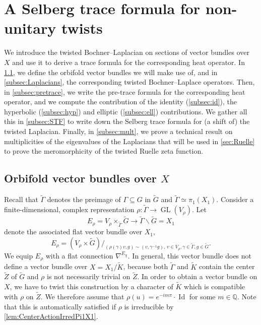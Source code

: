 \documentclass[JEP,XML,SOM,Unicode,NoFloatCountersInSection,published]{cedram}
\theoremstyle{plain}
\theoremstyle{definition}
\theoremstyle{remark}
\newcommand{\Q}{\mathbb{Q}}
\DeclareMathOperator{\GL}{GL}
\DeclareMathOperator{\Id}{Id}
\numberwithin{equation}{section}
\begin{document}
\section{A Selberg trace formula for non-unitary twists}
\label{sec:STF}
We introduce the twisted Bochner--Laplacian on sections of vector bundles over~$X$ and use it to derive a trace formula for the corresponding heat operator. In \cref{subsec:vect},
we define the orbifold vector bundles we will make use of, and in \cref{subsec:Laplacians}, the corresponding twisted Bochner--Laplace operators. Then, in \cref{subsec:pretrace}, we write the pre-trace formula for the corresponding heat operator, and we compute the contribution of the identity (\cref{subsec:id}), the hyperbolic (\cref{subsec:hyp}) and elliptic (\cref{subsec:ell}) contributions. We gather all this in \cref{subsec:STF} to write down the Selberg trace formula for (a shift of) the twisted Laplacian. Finally, in \cref{subsec:mult}, we prove a technical result on multiplicities of the eigenvalues of the Laplacians that will be used in \cref{sec:Ruelle} to prove the meromorphicity of the twisted Ruelle zeta function.

\subsection{Orbifold vector bundles over $X$}
\label{subsec:vect}

Recall that $\widetilde{\Gamma}$ denotes the preimage of $\Gamma\subseteq G$ in $\widetilde{G}$ and $\widetilde{\Gamma}\simeq\pi_1(X_1)$. Consider a finite-dimensional, complex representation $\rho:\widetilde{\Gamma}\to\GL(V_\rho)$. Let
\[
E_\rho = V_\rho\times_{\widetilde{\Gamma}}\widetilde{G}\to\widetilde{\Gamma}\backslash\widetilde{G}=X_1
\]
denote the associated flat vector bundle over $X_1$, \ie
\[
E_\rho = (V_\rho\times\widetilde{G})/_{(\rho(\gamma)v,g)\sim(v,\gamma^{-1}g),\,v\in V_\rho,\gamma\in\widetilde{\Gamma},g\in\widetilde{G}}.
\]
We equip $E_\rho$ with a flat connection $\nabla^{E_\chi}$. In general, this vector bundle does not define a vector bundle over $X=X_1/\widetilde{K}$, because both $\widetilde{\Gamma}$ and $\widetilde{K}$ contain the center $\widetilde{Z}$ of $\widetilde{G}$ and $\rho$ is not necessarily trivial on $\widetilde{Z}$. In order to obtain a vector bundle on $X$, we have to twist this construction by a character of $\widetilde{K}$ which is compatible with $\rho$ on $\widetilde{Z}$. We therefore assume that $\rho(u)=e^{-im\pi} \cdot \Id$ for some $m\in\Q$. Note that this is automatically satisfied if $\rho$ is irreducible by \cref{lem:CenterActionIrredPi1X1}.
\end{document}

